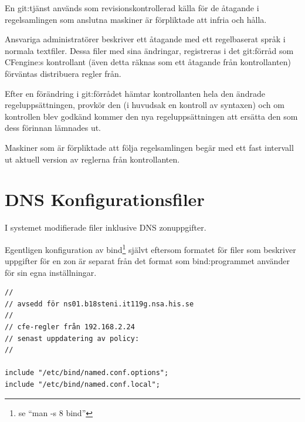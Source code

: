 \documentclass[swedish,10pt,a4paper]{report}
\begin{document}
En git:tjänst används som revisionskontrollerad källa för de åtagande i regelsamlingen som anslutna maskiner är
förpliktade att infria och hålla.

Ansvariga administratörer beskriver ett åtagande med ett regelbaserat språk i normala
textfiler. Dessa filer med sina ändringar, registreras i det git:förråd som CFengine:s kontrollant
(även detta räknas som ett åtagande från kontrollanten) förväntas distribuera regler från.

Efter en förändring i git:förrådet hämtar kontrollanten hela den ändrade regeluppsättningen, provkör den (i huvudsak
en kontroll av syntaxen) och om kontrollen blev godkänd kommer den nya
regeluppsättningen att ersätta den som dess förinnan lämnades ut.

Maskiner som är förpliktade att följa regelsamlingen begär med ett
fast intervall ut aktuell version av reglerna från kontrollanten.



\appendix

\addappheadtotoc

\section{DNS Konfigurationsfiler}\label{appendix:dns_conf_files}

I systemet modifierade filer inklusive DNS zonuppgifter.

Egentligen konfiguration av bind\footnote{se ``man -s 8 bind''} självt
eftersom formatet för filer som beskriver uppgifter för en zon är separat
från det format som bind:programmet använder för sin egna inställningar.

\begin{lstlisting}[caption={/etc/bind/named.conf}]
//
// avsedd för ns01.b18steni.it119g.nsa.his.se
//
// cfe-regler från 192.168.2.24
// senast uppdatering av policy:
//

include "/etc/bind/named.conf.options";
include "/etc/bind/named.conf.local";
\end{lstlisting}
\end{document}
